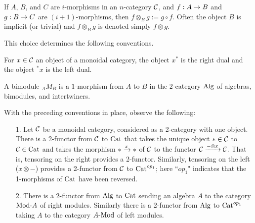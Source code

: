 \documentclass{amsart}
\begin{document}
\begin{definition} \label{def-tensorcomp}
If $A$, $B$, and $C$ are $i$-morphisms in an $n$-category $\mathcal C$, and $f: A \rightarrow B$ and $g: B \rightarrow C$ are $(i+1)$-morphisms, then $f \otimes_B g := g \circ f$.  Often the object $B$ is implicit (or trivial) and $f \otimes_B g$ is denoted simply $f \otimes g$.
\end{definition}

This choice determines the following conventions.
\begin{definition}
For $x \in \mathcal C$ an object of a monoidal category, the object $x^*$ is the right dual and the object ${}^*x$ is the left dual.
\end{definition}
\begin{definition}
A bimodule ${}_A M_B$ is a $1$-morphism from $A$ to $B$ in the $2$-category $\mathrm{Alg}$ of algebras, bimodules, and intertwiners.
\end{definition}

With the preceding conventions in place, observe the following:
\begin{itemize}
\item[1.] Let $\mathcal C$ be a monoidal category, considered as a 2-category with one object.  There is a 2-functor from $\mathcal C$ to $\mathrm{Cat}$ that takes the unique object $\ast \in \mathcal C$ to $\mathcal C \in \mathrm{Cat}$ and takes the morphism $\ast \xrightarrow{x} \ast$ of $\mathcal C$ to the functor $\mathcal C \xrightarrow{- \otimes x} \mathcal C$.  That is, tensoring on the right provides a 2-functor.  Similarly, tensoring on the left ($x \otimes -$) provides a 2-functor from $\mathcal C$ to $\mathrm{Cat}^{op_1}$; here ``$op_1$" indicates that the 1-morphisms of $\mathrm{Cat}$ have been reversed.
\item[2.] There is a 2-functor from $\mathrm{Alg}$ to $\mathrm{Cat}$ sending an algebra $A$ to the category $\Mod{}{A}$ of right modules.  Similarly there is a 2-functor from $\mathrm{Alg}$ to $\mathrm{Cat}^{op_1}$ taking $A$ to the category $\Mod{A}{}$ of left modules.
\end{itemize}



\end{document}
